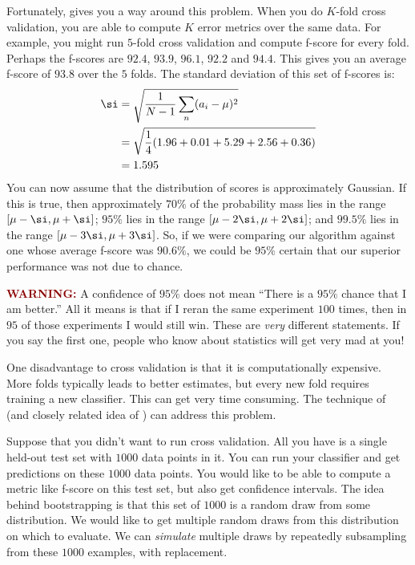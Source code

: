 Fortunately,  gives you a way around this
problem.  When you do $K$-fold cross validation, you are able to
compute $K$ error metrics over the same data.  For example, you might
run $5$-fold cross validation and compute f-score for every fold.
Perhaps the f-scores are $92.4$, $93.9$, $96.1$, $92.2$ and $94.4$.
This gives you an average f-score of $93.8$ over the $5$ folds.  The
standard deviation of this set of f-scores is:
\begin{align} \label{eq:prac:stddev}
\si
&= \sqrt{ \frac 1 {N-1} \sum_n (a_i - \mu)^2 } \\
&= \sqrt{ \frac 1 4 (1.96 + 0.01 + 5.29 + 2.56 + 0.36) } \\
&= 1.595
\end{align}
You can now assume that the distribution of scores is approximately
Gaussian.  If this is true, then approximately $70\%$ of the
probability mass lies in the range $[\mu-\si, \mu+\si]$; $95\%$ lies
in the range $[\mu-2\si,\mu+2\si]$; and $99.5\%$ lies in the range
$[\mu-3\si,\mu+3\si]$.  So, if we were comparing our algorithm against
one whose average f-score was $90.6\%$, we could be $95\%$ certain
that our superior performance was not due to chance.

\textcolor{darkred}{\bf WARNING:} A confidence of $95\%$ does not mean
``There is a $95\%$ chance that I am better.''  All it means is that
if I reran the same experiment $100$ times, then in $95$ of those
experiments I would still win.  These are \emph{very} different
statements.  If you say the first one, people who know about
statistics will get very mad at you!

One disadvantage to cross validation is that it is computationally
expensive.  More folds typically leads to better estimates, but every
new fold requires training a new classifier.  This can get very time
consuming.  The technique of  (and closely
related idea of ) can address this problem.

Suppose that you didn't want to run cross validation.  All you have is
a single held-out test set with $1000$ data points in it.  You can run
your classifier and get predictions on these $1000$ data points.  You
would like to be able to compute a metric like f-score on this test
set, but also get confidence intervals.  The idea behind bootstrapping
is that this set of $1000$ is a random draw from some distribution.
We would like to get multiple random draws from this distribution on
which to evaluate.  We can \emph{simulate} multiple draws by
repeatedly subsampling from these $1000$ examples, with replacement.

